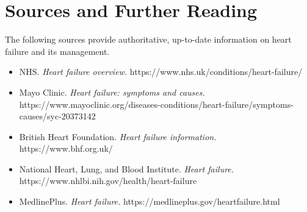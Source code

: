 \section*{Sources and Further Reading}
The following sources provide authoritative, up-to-date information on heart failure and its management.
\begin{itemize}
    \item NHS. \textit{Heart failure overview.} https://www.nhs.uk/conditions/heart-failure/
    \item Mayo Clinic. \textit{Heart failure: symptoms and causes.} https://www.mayoclinic.org/diseases-conditions/heart-failure/symptoms-causes/syc-20373142
    \item British Heart Foundation. \textit{Heart failure information.} https://www.bhf.org.uk/
    \item National Heart, Lung, and Blood Institute. \textit{Heart failure.} https://www.nhlbi.nih.gov/health/heart-failure
    \item MedlinePlus. \textit{Heart failure.} https://medlineplus.gov/heartfailure.html
\end{itemize}
